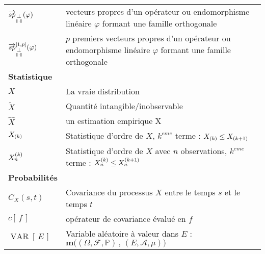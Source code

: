 \begin{tabularx}{\textwidth}{lX}
	$\overrightarrow{sp}_{\underset{\Vert \cdot \Vert}{\perp}}(\varphi)$                    & vecteurs propres d'un opérateur ou endomorphisme linéaire $\varphi$ formant une famille orthogonale                                                \\
	$\overrightarrow{sp}_{\underset{\Vert \cdot \Vert}{\perp}}^{[1,p]}(\varphi)$            & $p$ premiers vecteurs propres d'un opérateur ou endomorphisme linéaire $\varphi$ formant une famille orthogonale                                   \\
	\midrule
	\textbf{Statistique}                                             &                                                                                                                                                    \\
	\midrule
	$X$                                                              & La \og vraie \fg distribution                                                                                                                      \\
	$\widetilde{X}$                                                  & Quantité intangible/inobservable                                                                                                                   \\
	$\widehat{X}$                                                    & un estimation empirique X                                                                                                                          \\
	$X_{(k)}$                                                   & Statistique d'ordre de $X$, $k^{eme}$ terme : $X_{(k)} \leq X_{(k+1)}$                                                               \\
	${X} _ {n} ^{\left(k\right)}$                                              & Statistique d'ordre de $X$ avec $n$ observations, $k^{eme}$ terme : ${X} _ {n} ^{\left(k\right)} \leq {X} _ {n} ^{\left(k+1\right)}$                                   \\
	\midrule
	\textbf{Probabilités}                                            &                                                                                                                                                    \\
	\midrule
	$C_X (s,t)$                                                      & Covariance du processus $X$ entre le temps $s$ et le temps $t$                                                                                     \\
	$c\left[ \, f \, \right]$                                        & opérateur de covariance évalué en $f$                                                                                                              \\
	$\operatorname{VAR}\left[ \, E \,\right]$                        & Variable aléatoire à valeur dans $E$ : $\mathbf m\bigl( \left(\Omega, \mathcal F, \mathds P\right) \, , \, \left(E, \mathcal A, \mu\right) \bigr)$ \\
	\bottomrule
\end{tabularx}